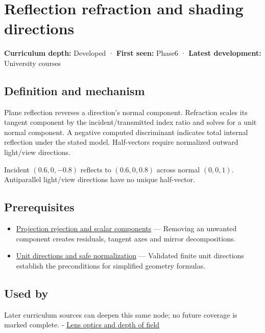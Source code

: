 \hypertarget{appendix-44e00863b4d5}{}\label{referencestart:appendix-44e00863b4d5}
\section{Reflection refraction and shading directions}\label{appendix-44e00863b4d5-reflection-refraction-and-shading-directions}

\textbf{Curriculum depth:} Developed · \textbf{First seen:} Phase6 · \textbf{Latest development:} University courses

\subsection{Definition and mechanism}\label{appendix-44e00863b4d5-definition-and-mechanism}

Plane reflection reverses a direction's normal component. Refraction scales its tangent component by the incident/transmitted index ratio and solves for a unit normal component. A negative computed discriminant indicates total internal reflection under the stated model. Half-vectors require normalized outward light/view directions.

Incident \((0.6,0,-0.8)\) reflects to \((0.6,0,0.8)\) across normal \((0,0,1)\). Antiparallel light/view directions have no unique half-vector.

\subsection{Prerequisites}\label{appendix-44e00863b4d5-prerequisites}

\begin{itemize}
\tightlist
\item
  \hyperref[appendix-505a502c372a]{Projection rejection and scalar components} --- Removing an unwanted component creates residuals, tangent axes and mirror decompositions.
\item
  \hyperref[appendix-f744e41b95b4]{Unit directions and safe normalization} --- Validated finite unit directions establish the preconditions for simplified geometry formulas.
\end{itemize}

\subsection{Used by}\label{appendix-44e00863b4d5-used-by}

Later curriculum sources can deepen this same node; no future coverage is marked complete. - \hyperref[appendix-21f8456e2629]{Lens optics and depth of field}

